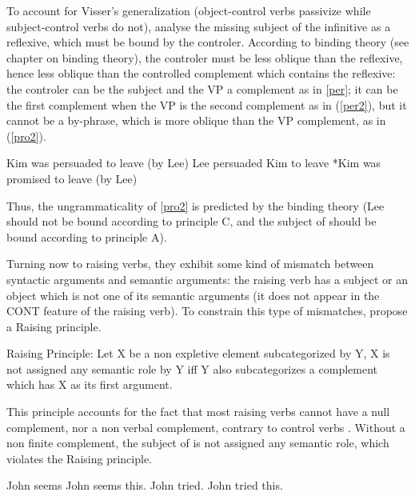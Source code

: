 \documentclass[output=paper]{langsci/langscibook}
\begin{document}
To account for Visser's generalization (object-control verbs passivize  while subject-control verbs do not), \citet{SagandPollard1991} analyse the missing subject of the infinitive as a reflexive, which must be bound by the controler. According to binding theory (see chapter on binding theory), the controler must be less oblique than the reflexive, hence less oblique than the controlled complement which contains the reflexive: the controler can be the subject and the VP a complement as in \ref{per}; it can be the first complement when the VP is the second complement as in (\ref{per2}), but it cannot be a  by-phrase, which is more oblique than the VP complement, as in (\ref{pro2}).

\begin{exe}
\ex \begin{xlist}
\ex \label{per} Kim was persuaded to leave (by Lee) 
\ex \label{per2} Lee persuaded Kim to leave 
\ex \label{pro2}*Kim was promised to leave (by Lee) 
\end{xlist}	
\end{exe}

Thus, the ungrammaticality of \ref{pro2} is predicted by the binding theory (Lee should not be bound according to principle C, and the subject of  should be bound according to principle A).

Turning now to raising verbs, they exhibit some kind of mismatch between syntactic arguments and semantic arguments: the raising verb has a subject or an object which is not one of its semantic arguments (it does not appear in the CONT feature of the raising verb). To constrain this type of mismatches, \citet[140]{PollardandSag1994}propose a Raising principle.

\begin{exe}
\ex Raising Principle: Let X be a non expletive element subcategorized by Y, X is not assigned any semantic role by Y iff Y also subcategorizes a complement which has X as its first argument.
\end{exe}

This principle accounts for the fact  that most raising verbs cannot have a null complement, nor a non verbal complement, contrary to control verbs \citep{Jacobson1990}. Without a non finite complement, the subject of  is not assigned any semantic role, which violates the Raising principle.

\begin{exe}
\ex \begin{xlist}
\ex * John seems
\ex * John seems this.
\ex John tried.
\ex John tried this.
\end{xlist}	
	
\end{exe}
\end{document}

